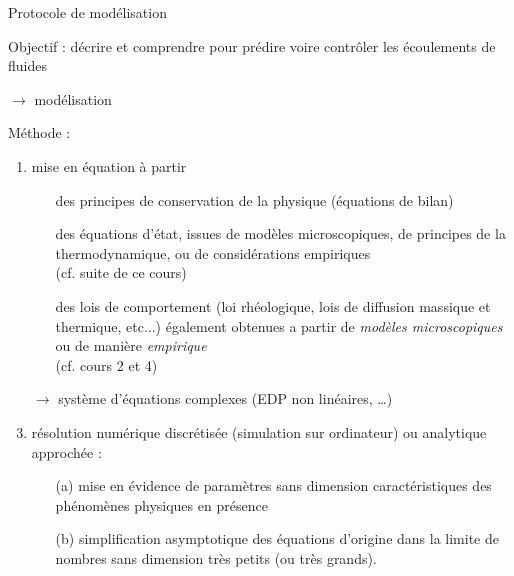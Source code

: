 \begin{frame}{Protocole de modélisation}

\small

Objectif : décrire et comprendre pour prédire voire contrôler les écoulements de fluides

\medskip 

\centerline{$\rightarrow$ \sc modélisation}

\bigskip

\pause

Méthode : 

\medskip

\begin{enumerate}
\item
	\textcolor{rouge}{mise en équation} à partir 
  \begin{itemize}
	\item[\checkmark]
		des principes de conservation de la physique (équations de bilan)
	\item[\checkmark]
  		des \textcolor{rouge}{équations d'état}, issues de modèles microscopiques, 
		de principes de la thermodynamique, ou de considérations empiriques
		\\ (cf. suite de ce cours)
	\item[\checkmark] des \textcolor{rouge}{lois de comportement} (loi rhéologique, lois de diffusion massique et thermique, etc...) 
		également obtenues a partir de {\em modèles microscopiques} 
		ou de manière {\em empirique}
		\\ (cf. cours 2 et 4)
	\end{itemize}
\item[]
  $\rightarrow$ système d'équations complexes (EDP non linéaires, \ldots)
\pause
\bigskip
\item
	\textcolor{rouge}{résolution} numérique discrétisée (simulation sur ordinateur)
  ou analytique approchée :
	\begin{enumerate}
	\item[(a)]
		mise en évidence de paramètres sans dimension caractéristiques des phénomènes physiques en présence
	\item[(b)]
  		simplification asymptotique des équations d'origine dans la limite de nombres sans dimension 
  		très petits (ou très grands).
	\end{enumerate}
\end{enumerate}

\vspace{20mm}

\end{frame}



